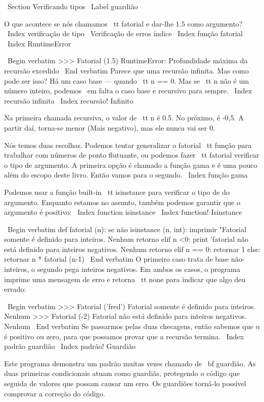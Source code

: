 \documentclass[10pt]{book}
\begin{document}
{{{{\ Section {Verificando tipos}
\ Label {guardião}

O que acontece se nós chamamos {\ tt fatorial} e dar-lhe 1.5 como argumento?
\ Index {verificação de tipo}
\ {Verificação de erros} índice
\ Index {função fatorial}
\ Index {} RuntimeError

\ Begin {verbatim}
>>> Fatorial (1.5)
RuntimeError: Profundidade máxima da recursão excedido
\ End {verbatim}
%
Parece que uma recursão infinita. Mas como pode ser isso? Há um
caso base --- quando {\ tt n == 0}. Mas se {\ tt n} não é um número inteiro,
podemos {\ em falta} o caso base e recursivo para sempre.
\ Index {recursão infinita}
\ Index {recursão! Infinito}

Na primeira chamada recursiva, o valor de {\ tt n} é 0.5.
No próximo, é -0,5. A partir daí, torna-se menor
(Mais negativo), mas ele nunca vai ser 0.

Nós temos duas escolhas. Podemos tentar generalizar o fatorial {\ tt}
função para trabalhar com números de ponto flutuante, ou podemos fazer {\ tt
  fatorial} verificar o tipo de argumento. A primeira opção é
chamado a função gama e é uma
pouco além do escopo deste livro. Então vamos para o segundo.
\ Index {função gama}

Podemos usar a função built-in {\ tt isinstance} para verificar o tipo de
do argumento. Enquanto estamos no assunto, também podemos garantir que o
argumento é positivo:
\ Index {function isinstance}
\ Index {function! Isinstance}

\ Begin {verbatim}
def fatorial (n):
    se não isinstance (n, int):
        imprimir "Fatorial somente é definido para inteiros.
        Nenhum retorno
    elif n <0:
        print 'fatorial não está definido para inteiros negativos.
        Nenhum retorno
    elif n == 0:
        retornar 1
    else:
        retornar n * fatorial (n-1)
\ End {verbatim}
%
O primeiro caso trata de base não-inteiros, o
segundo pega inteiros negativos. Em ambos os casos, o programa imprime
uma mensagem de erro e retorna {\ tt none} para indicar que algo
deu errado:

\ Begin {verbatim}
>>> Fatorial ('fred')
Fatorial somente é definido para inteiros.
Nenhum
>>> Fatorial (-2)
Fatorial não está definido para inteiros negativos.
Nenhum
\ End {verbatim}
% 
Se passarmos pelas duas checagens, então sabemos que $ n $ é positivo ou
zero, para que possamos provar que a recursão termina.
\ Index {padrão guardião}
\ Index {padrão! Guardião}

Este programa demonstra um padrão muitas vezes chamado de {\ bf guardião}.
As duas primeiras condicionais atuam como guardiãs, protegendo o código que
seguida de valores que possam causar um erro. Os guardiões torná-lo
possível comprovar a correção do código.

}}}}
\end{document}
